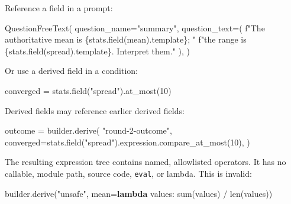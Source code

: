\documentclass[
  10pt,
]{report}
\newenvironment{Shaded}{}{}
\newcommand{\BuiltInTok}[1]{\textcolor[rgb]{0.00,0.50,0.00}{#1}}
\newcommand{\DecValTok}[1]{\textcolor[rgb]{0.25,0.63,0.44}{#1}}
\newcommand{\KeywordTok}[1]{\textcolor[rgb]{0.00,0.44,0.13}{\textbf{#1}}}
\newcommand{\NormalTok}[1]{#1}
\newcommand{\OperatorTok}[1]{\textcolor[rgb]{0.40,0.40,0.40}{#1}}
\newcommand{\SpecialCharTok}[1]{\textcolor[rgb]{0.25,0.44,0.63}{#1}}
\newcommand{\SpecialStringTok}[1]{\textcolor[rgb]{0.73,0.40,0.53}{#1}}
\newcommand{\StringTok}[1]{\textcolor[rgb]{0.25,0.44,0.63}{#1}}
\begin{document}
Reference a field in a prompt:

\begin{Shaded}
\begin{Highlighting}[]
\NormalTok{QuestionFreeText(}
\NormalTok{    question\_name}\OperatorTok{=}\StringTok{"summary"}\NormalTok{,}
\NormalTok{    question\_text}\OperatorTok{=}\NormalTok{(}
        \SpecialStringTok{f"The authoritative mean is }\SpecialCharTok{\{}\NormalTok{stats}\SpecialCharTok{.}\NormalTok{field(}\StringTok{\textquotesingle{}mean\textquotesingle{}}\NormalTok{)}\SpecialCharTok{.}\NormalTok{template}\SpecialCharTok{\}}\SpecialStringTok{; "}
        \SpecialStringTok{f"the range is }\SpecialCharTok{\{}\NormalTok{stats}\SpecialCharTok{.}\NormalTok{field(}\StringTok{\textquotesingle{}spread\textquotesingle{}}\NormalTok{)}\SpecialCharTok{.}\NormalTok{template}\SpecialCharTok{\}}\SpecialStringTok{. Interpret them."}
\NormalTok{    ),}
\NormalTok{)}
\end{Highlighting}
\end{Shaded}

Or use a derived field in a condition:

\begin{Shaded}
\begin{Highlighting}[]
\NormalTok{converged }\OperatorTok{=}\NormalTok{ stats.field(}\StringTok{"spread"}\NormalTok{).at\_most(}\DecValTok{10}\NormalTok{)}
\end{Highlighting}
\end{Shaded}

Derived fields may reference earlier derived fields:

\begin{Shaded}
\begin{Highlighting}[]
\NormalTok{outcome }\OperatorTok{=}\NormalTok{ builder.derive(}
    \StringTok{"round{-}2{-}outcome"}\NormalTok{,}
\NormalTok{    converged}\OperatorTok{=}\NormalTok{stats.field(}\StringTok{"spread"}\NormalTok{).expression.compare\_at\_most(}\DecValTok{10}\NormalTok{),}
\NormalTok{)}
\end{Highlighting}
\end{Shaded}

The resulting expression tree contains named, allowlisted operators. It
has no callable, module path, source code, \texttt{eval}, or lambda.
This is invalid:

\begin{Shaded}
\begin{Highlighting}[]
\NormalTok{builder.derive(}\StringTok{"unsafe"}\NormalTok{, mean}\OperatorTok{=}\KeywordTok{lambda}\NormalTok{ values: }\BuiltInTok{sum}\NormalTok{(values) }\OperatorTok{/} \BuiltInTok{len}\NormalTok{(values))}
\end{Highlighting}
\end{Shaded}
\end{document}
